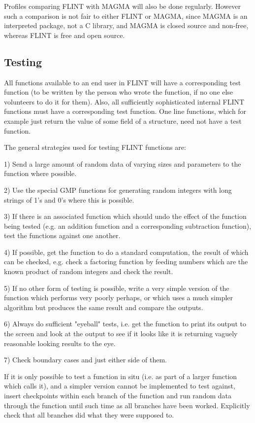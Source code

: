 \documentclass[a4paper,10pt]{article}
\begin{document}
Profiles comparing FLINT with MAGMA will also be done regularly. However such a comparison is not fair to either FLINT or MAGMA, since MAGMA is an interpreted package, not a C library, and MAGMA is closed source and non-free, whereas FLINT is free and open source.

\subsection{Testing}
All functions available to an end user in FLINT will have a corresponding test function (to be written by the person who wrote the function, if no one else volunteers to do it for them). Also, all sufficiently sophisticated internal FLINT functions must have a corresponding test function. One line functions, which for example just return the value of some field of a structure, need not have a test function.

The general strategies used for testing FLINT functions are:

1) Send a large amount of random data of varying sizes and parameters to the function where possible. 

2) Use the special GMP functions for generating random integers with long strings of 1's and 0's where this is possible.

3) If there is an associated function which should undo the effect of the function being tested (e.g. an addition function and a corresponding subtraction function), test the functions against one another.

4) If possible, get the function to do a standard computation, the result of which can be checked, e.g. check a factoring function by feeding numbers which are the known product of random integers and check the result. 

5) If no other form of testing is possible, write a very simple version of the function which performs very poorly perhaps, or which uses a much simpler algorithm but produces the same result and compare the outputs. 

6) Always do sufficient "eyeball" tests, i.e. get the function to print its output to the screen and look at the output to see if it looks like it is returning vaguely reasonable looking results to the eye.

7) Check boundary cases and just either side of them.

If it is only possible to test a function in situ (i.e. as part of a larger function which calls it), and a simpler version cannot be implemented to test against, insert checkpoints within each branch of the function and run random data through the function until such time as all branches have been worked. Explicitly check that all branches did what they were supposed to. 
\end{document}
